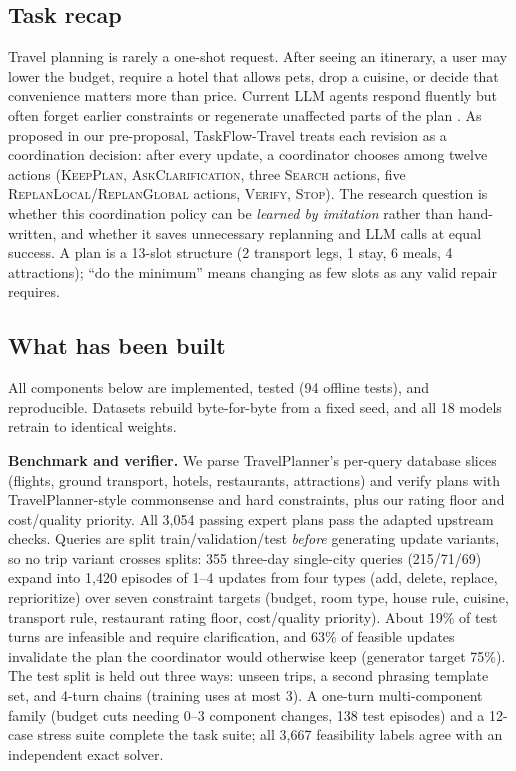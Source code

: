 \documentclass{article}
\begin{document}
\subsection{Task recap}
Travel planning is rarely a one-shot request. After seeing an itinerary, a
user may lower the budget, require a hotel that allows pets, drop a cuisine,
or decide that convenience matters more than price. Current LLM agents
respond fluently but often forget earlier constraints or regenerate
unaffected parts of the plan
\citep{xie2024travelplanner,oh2025flextravelplanner}. As proposed in our
pre-proposal, TaskFlow-Travel treats each revision as a coordination
decision: after every update, a coordinator chooses among twelve actions
(\textsc{KeepPlan}, \textsc{AskClarification}, three \textsc{Search} actions,
five \textsc{ReplanLocal}/\textsc{ReplanGlobal} actions, \textsc{Verify},
\textsc{Stop}). The research question is whether this coordination policy can
be \emph{learned by imitation} rather than hand-written, and whether it saves
unnecessary replanning and LLM calls at equal success. A plan is a 13-slot
structure (2 transport legs, 1 stay, 6 meals, 4 attractions); ``do the
minimum'' means changing as few slots as any valid repair requires.

\subsection{What has been built}
All components below are implemented, tested (94 offline tests), and
reproducible. Datasets rebuild byte-for-byte from a fixed seed, and all 18
models retrain to identical weights.

\textbf{Benchmark and verifier.} We parse TravelPlanner's per-query database
slices (flights, ground transport, hotels, restaurants, attractions) and
verify plans with TravelPlanner-style commonsense and hard constraints, plus
our rating floor and cost/quality priority. All 3{,}054 passing expert plans
pass the adapted upstream checks. Queries are split
train/validation/test \emph{before} generating update variants, so no trip
variant crosses splits: 355 three-day single-city queries (215/71/69) expand
into 1{,}420 episodes of 1--4 updates from four types (add, delete, replace,
reprioritize) over seven constraint targets (budget, room type, house rule,
cuisine, transport rule, restaurant rating floor, cost/quality priority).
About 19\% of test turns are infeasible and require clarification, and 63\%
of feasible updates invalidate the plan the coordinator would
otherwise keep (generator target 75\%). The test split is held out three
ways: unseen trips, a second phrasing template set, and 4-turn chains
(training uses at most 3). A one-turn multi-component family (budget cuts
needing 0--3 component changes, 138 test episodes) and a 12-case stress suite
complete the task suite; all 3{,}667 feasibility labels agree with an
independent exact solver.
\end{document}
